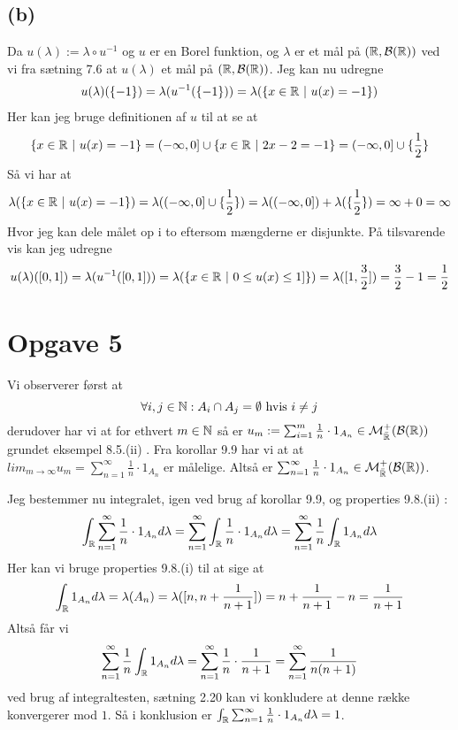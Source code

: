 \documentclass{article}
\begin{document}
\subsection*{(b)}
Da $u(\lambda) := \lambda \circ u^{-1}$ og $u$ er en Borel funktion, 
og $\lambda$ er et mål på $(\mathbb{R}, \mathcal{B}(\mathbb{R}))$ ved vi fra sætning 7.6 \cite{lim} at
$u(\lambda)$ et mål på $(\mathbb{R}, \mathcal{B}(\mathbb{R}))$.
Jeg kan nu udregne 
\begin{align*}
    &u(\lambda)(\{ -1 \}) = \lambda(u^{-1}(\{-1\})) 
    = \lambda(\{x \in \mathbb{R} \text{ } | \text{ } u(x) = -1 \})  \\
\end{align*}
Her kan jeg bruge definitionen af $u$ til at se at 
\[
    \{x \in \mathbb{R} \text{ } | \text{ } u(x) = -1 \} = (-\infty, 0] \cup \{x \in \mathbb{R}  \text{ } | \text{ } 2x -2 = -1 \} = (-\infty, 0] \cup \{ \frac{1}{2} \}
\]
Så vi har at 
\begin{align*}
    \lambda(\{x \in \mathbb{R} \text{ } | \text{ } u(x) = -1 \})
    = \lambda((-\infty, 0] \cup \{\frac{1}{2}\} ) 
    = \lambda((-\infty, 0]) + \lambda(\{\frac{1}{2}\} ) = \infty + 0 = \infty
\end{align*}
Hvor jeg kan dele målet op i to eftersom mængderne er disjunkte.
På tilsvarende vis kan jeg udregne
\begin{align*}
u(\lambda)([0,1]) = \lambda(u^{-1}( [0,1] )) 
= \lambda(\{x \in \mathbb{R} \text{ } | \text{ } 0 \le u(x) \le 1] \})
= \lambda([1, \frac{3}{2}]) = \frac{3}{2} - 1 = \frac{1}{2}
\end{align*}

\section*{Opgave 5}
Vi observerer først at 
\[
    \forall i,j \in \mathbb{N} : A_i \cap A_j = \emptyset \text{ hvis } i \neq j
\]
derudover har vi at for ethvert $m \in \mathbb{N}$ så er 
$u_m := \sum_{i=1}^{m} \frac{1}{n} \cdot  1_{A_n} \in \mathcal{M}_{\bar{\mathbb{R}}}^{+}(\mathcal{B}(\mathbb{R}))$ 
grundet eksempel 8.5.(ii) \cite{lim}.
Fra korollar 9.9 \cite{lim} har vi at at 
$lim_{m \to \infty} u_m = \sum_{n=1}^{\infty} \frac{1}{n} \cdot  1_{A_n}$ er målelige.
Altså er $\sum_{n=1}^{\infty} \frac{1}{n} \cdot  1_{A_n} \in \mathcal{M}_{\bar{\mathbb{R}}}^{+}(\mathcal{B}(\mathbb{R}))$.

Jeg bestemmer nu integralet, igen ved brug af korollar 9.9, og properties 9.8.(ii) \cite{lim}: 
\[
    \int_{\mathbb{R}} \sum_{n=1}^{\infty} \frac{1}{n} \cdot  1_{A_n} d\lambda
    = \sum_{n=1}^{\infty} \int_{\mathbb{R}} \frac{1}{n} \cdot  1_{A_n} d\lambda
    = \sum_{n=1}^{\infty} \frac{1}{n} \int_{\mathbb{R}} 1_{A_n} d\lambda
\]
Her kan vi bruge properties 9.8.(i) til at sige at 
\[
\int_{\mathbb{R}} 1_{A_n} d\lambda = \lambda(A_n) = \lambda([n, n+ \frac{1}{n+1}]) = n + \frac{1}{n+1} - n = \frac{1}{n+1}
\]
Altså får vi
\[
\sum_{n=1}^{\infty} \frac{1}{n} \int_{\mathbb{R}} 1_{A_n} d\lambda
= \sum_{n=1}^{\infty} \frac{1}{n} \cdot \frac{1}{n+1} 
= \sum_{n=1}^{\infty} \frac{1}{n(n+1)}
\]
ved brug af integraltesten, sætning 2.20 \cite{an1} kan vi konkludere at 
denne række konvergerer mod $1$.
Så i konklusion er $\int_{\mathbb{R}} \sum_{n=1}^{\infty} \frac{1}{n} \cdot  1_{A_n} d\lambda = 1$.
\end{document}
